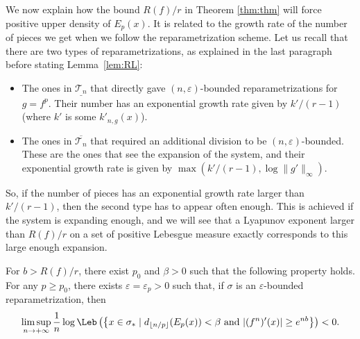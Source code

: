 We now explain how the bound $R(f) / r$ in Theorem \ref{thm:thm} will force positive upper density of $E_p(x)$.
It is related to the growth rate of the number of pieces we get when we follow the reparametrization scheme.
Let us recall that there are two types of reparametrizations, as explained in the last paragraph before stating Lemma~\ref{lem:RL}:
\begin{itemize}
\item
The ones in $\underline{\mathcal{T}_n}$ that directly gave $(n, \varepsilon)$-bounded reparametrizations for $g = f^p$. Their number has an exponential growth rate given by $k' / (r-1)$ (where $k'$ is some $k'_{n,g}(x)$).
\item
The ones in $\overline{\mathcal{T}_n}$ that required an additional division to be $(n,\varepsilon)$-bounded. These are the ones that see the expansion of the system, and their exponential growth rate is given by $\max (k' / (r-1), \log \|g'\|_{\infty})$.
\end{itemize}
So, if the number of pieces has an exponential growth rate larger than $k' / (r-1)$, then the second type has to appear often enough. This is achieved if the system is expanding enough, and we will see that a Lyapunov exponent larger than $R(f) / r$ on a set of positive Lebesgue measure exactly corresponds to this large enough expansion.

\begin{prop}
\label{prop:dens-pos}
For $b > R(f) / r$, there exist $p_0$ and $\beta > 0$ such that the following property holds.
For any $p \geq p_0$, there exists $\varepsilon = \varepsilon_p > 0$ such that, if $\sigma$ is an $\varepsilon$-bounded reparametrization, then
\[
\limsup_{n \to +\infty} \frac{1}{n} \log \Leb \left (\left \{ x \in \sigma_* \mid d_{\lfloor n / p \rfloor}(E_p(x)) < \beta \text{ and } | (f^n)'(x) | \geq e^{nb} \right \} \right) < 0.
\]
\end{prop}

